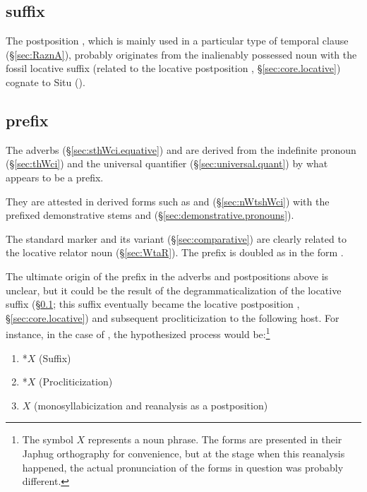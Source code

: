 \subsection{ suffix} \label{sec:denominal.postposition.s}
The postposition  , which is mainly used in a particular type of temporal clause (§\ref{sec:RaznA}), probably originates from the inalienably possessed noun  with the fossil locative suffix  (related to the locative postposition , §\ref{sec:core.locative}) cognate to Situ  (\citealt[330--331]{linxr93jiarong}).

 \subsection{ prefix} \label{sec:denominal.adverb.s.prefix}
 The adverbs  (§\ref{sec:sthWci.equative}) and  are derived from the indefinite pronoun   (§\ref{sec:thWci}) and the universal quantifier  (§\ref{sec:universal.quant}) by what appears to be a  prefix. 
 
 They are attested in derived forms such as  and  (§\ref{sec:nWtshWci}) with the prefixed demonstrative stems  and  (§\ref{sec:demonstrative.pronouns}).
  
The standard marker  and its variant  (§\ref{sec:comparative}) are clearly related  to the locative relator noun  (§\ref{sec:WtaR}). The prefix  is doubled as  in the form .

 The ultimate origin of the prefix  in the adverbs and postpositions above is unclear, but it could be the result of the degrammaticalization of the locative  suffix (§\ref{sec:denominal.postposition.s}; this suffix eventually became the locative postposition , §\ref {sec:core.locative}) and subsequent procliticization to the following host. For instance, in the case of , the hypothesized process would be:\footnote{The symbol $X$ represents a noun phrase. The forms are presented in their Japhug orthography for convenience, but at the stage when this reanalysis happened, the actual pronunciation of the forms in question was probably different.  }
 
 \begin{enumerate}
\item  *$X$ (Suffix)
\item  *$X$ (Procliticization)
\item  $X$  (monosyllabicization and reanalysis as a postposition) 
\end{enumerate}
 
 